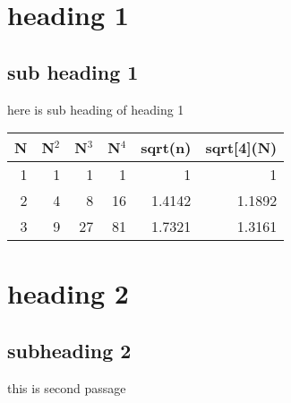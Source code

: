 \documentclass[11pt]{article}
\author{gnu}
\date{\today}
\title{}
\begin{document}
\tableofcontents

\section{heading 1}
\label{sec:org1954945}
\subsection{sub heading 1}
\label{sec:org2bfcd94}
here is sub heading of heading 1
\begin{tabular}{r|rrr|rr|}
N & N\(^{\text{2}}\) & N\(^{\text{3}}\) & N\(^{\text{4}}\) & sqrt(n) & sqrt[4](N)\\
\hline
1 & 1 & 1 & 1 & 1 & 1\\
2 & 4 & 8 & 16 & 1.4142 & 1.1892\\
3 & 9 & 27 & 81 & 1.7321 & 1.3161\\
\hline
\end{tabular}
\section{heading 2}
\label{sec:org2bb5431}
\subsection{subheading 2}
\label{sec:org23cd558}
this is second passage
\end{document}
